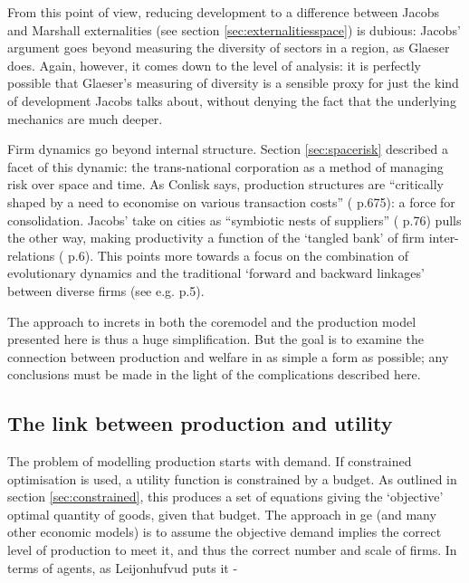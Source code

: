 From this point of view, reducing development to a difference between Jacobs and Marshall externalities (see section \ref{sec:externalitiesspace}) is dubious: Jacobs' argument goes beyond measuring the diversity of sectors in a region, as Glaeser does. Again, however, it comes down to the level of analysis: it is perfectly possible that Glaeser's measuring of diversity is a sensible proxy for just the kind of development Jacobs talks about, without denying the fact that the underlying mechanics are much deeper. 

Firm dynamics go beyond internal structure. Section \ref{sec:spacerisk} described a facet of this dynamic: the trans-national corporation as a method of managing risk over space and time.  As Conlisk says, production structures are ``critically shaped by a need to economise on various transaction costs'' (\citealt{conlisk_why_1996} p.675): a force for consolidation. Jacobs' take on cities as ``symbiotic nests of suppliers'' (\citealt{jacobs_cities_1986} p.76) pulls the other way, making productivity a function of the `tangled bank' of firm inter-relations (\citealt{ellerman_jane_2002} p.6). This points more towards a focus on the combination of evolutionary dynamics and the traditional `forward and backward linkages' between diverse firms (see e.g. \citealt{brakman_introduction_2011} p.5).

The approach to \gls{increts} in both the \gls{coremodel} and the production model presented here is thus a huge simplification. But the goal is to examine the connection between production and welfare in as simple a form as possible; any conclusions must be made in the light of the complications described here.

\subsection{The link between production and utility \label{sec:prodtoutil}}

The problem of modelling production starts with demand. If constrained optimisation is used, a utility function is constrained by a budget. As outlined in section \ref{sec:constrained}, this produces a set of equations giving the `objective' optimal quantity of goods, given that budget. The approach in  \gls{ge} (and many other economic models) is to assume the objective demand implies the correct level of production to meet it, and thus the correct number and scale of firms. In terms of agents, as Leijonhufvud puts it -

